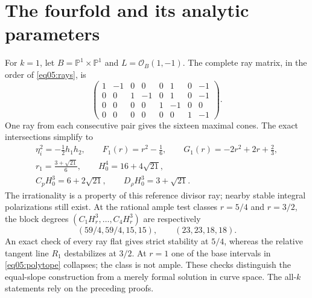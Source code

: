 \documentclass[11pt]{amsart}
\theoremstyle{definition}
\theoremstyle{remark}
\newcommand{\PP}{\mathbb P}
\newcommand{\cO}{\mathcal O}
\begin{document}
\section{The fourfold and its analytic parameters}\label{sec09:fourfold}

For \(k=1\), let \(B=\PP^1\times\PP^1\) and \(L=\cO_B(1,-1)\).
The complete ray matrix, in the order of \eqref{eq05:rays}, is
\begin{equation}\label{eq09:matrix}
 \begin{pmatrix}
 1&-1&0&0&0&1&0&-1\\
 0&0&1&-1&0&1&0&-1\\
 0&0&0&0&1&-1&0&0\\
 0&0&0&0&0&0&1&-1
 \end{pmatrix}.
\end{equation}
One ray from each consecutive pair gives the sixteen maximal cones.
The exact intersections simplify to
\begin{equation}\label{eq09:values}
 \begin{gathered}
 \eta_i^2=-\tfrac12h_1h_2,\qquad F_1(r)=r^2-\tfrac16,\qquad
 G_1(r)=-2r^2+2r+\tfrac23,\\
 r_1=\frac{3+\sqrt{21}}6,\qquad H_0^4=16+4\sqrt{21},\\
 C_pH_0^3=6+2\sqrt{21},\qquad
 D_\rho H_0^3=3+\sqrt{21}.
 \end{gathered}
\end{equation}
The irrationality is a property of this reference divisor ray;
nearby stable integral polarizations still exist.
At the rational ample test classes \(r=5/4\) and \(r=3/2\),
the block degrees \((C_1H_r^3,\ldots,C_4H_r^3)\) are respectively
\[
 (59/4,59/4,15,15),\qquad (23,23,18,18).
\]
An exact check of every ray flat gives strict stability at \(5/4\),
whereas the relative tangent line \(R_1\) destabilizes at \(3/2\).
At \(r=1\) one of the base intervals in \eqref{eq05:polytope}
collapses; the class is not ample. These checks distinguish the
equal-slope construction from a merely formal solution in curve
space. The all-\(k\) statements rely on the preceding proofs.
\end{document}
